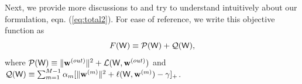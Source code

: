 \documentclass{article} %
\newcommand{\cW}{{\bf \mathsf{W}}}
\newcommand{\cZ}{{\bf Z}}
\newcommand{\cQ}{{\bf Q}}
\newcommand{\sw}{{\bf w}}
\newcommand{\ow}{{\bf w}^{(out)}}
\newcommand{\cL}{\mathcal{L}}
\newcommand{\sL}{\ell}
\newcommand{\aP}{{\mathcal{P}}}
\newcommand{\aQ}{{\mathcal{Q}}}
\begin{document}
Next, we provide more discussions to and try to understand intuitively about our formulation, eqn. (\ref{eq:total2}).
For ease of reference, we write this objective function as
\begin{equation}
  F(\cW) \equiv \aP(\cW) + \aQ(\cW),
\end{equation}
where $\aP(\cW)\equiv \lVert \ow \rVert^2 +\cL(\cW, \ow)$ and $\aQ(\cW) \equiv  \sum_{m=1}^{M-1}  \alpha_m [\lVert \sw^{(m)} \rVert^2+\sL(\cW, \sw^{(m)})-\gamma]_+$. 

\end{document}
